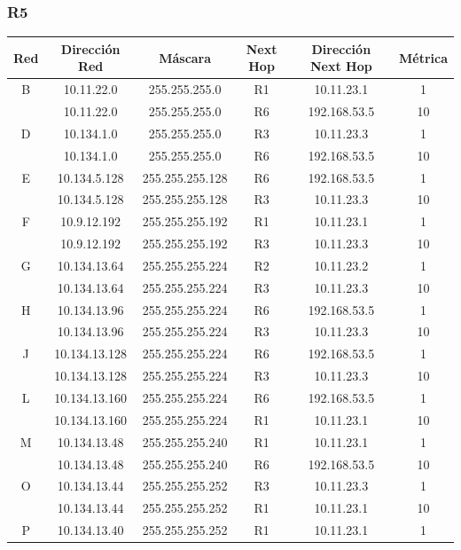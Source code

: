 \documentclass[12pt, a4paper, spanish]{article}
\begin{document}
\subsubsection{R5}
\begin{center}
\begin{tabular}{|c|c|c|c|c|c|}
	\hline
	Red & Dirección Red & Máscara & Next Hop & Dirección Next Hop & Métrica \\
	\hline
	\hline
	B & 10.11.22.0 & 255.255.255.0 & R1 & 10.11.23.1 & 1\\
	 & 10.11.22.0 & 255.255.255.0 & R6 & 192.168.53.5 & 10\\
	\hline
	D & 10.134.1.0 & 255.255.255.0 & R3 & 10.11.23.3 & 1\\
	 & 10.134.1.0 & 255.255.255.0 & R6 & 192.168.53.5 & 10\\
	\hline
	E & 10.134.5.128 & 255.255.255.128 & R6 & 192.168.53.5 & 1\\
	 & 10.134.5.128 & 255.255.255.128 & R3 & 10.11.23.3 & 10\\
	\hline
	F & 10.9.12.192 & 255.255.255.192 & R1 & 10.11.23.1 & 1\\
	 & 10.9.12.192 & 255.255.255.192 & R3 & 10.11.23.3 & 10\\
	\hline
	G & 10.134.13.64 & 255.255.255.224 & R2 & 10.11.23.2 & 1\\
	 & 10.134.13.64 & 255.255.255.224 & R3 & 10.11.23.3 & 10\\
	\hline
	H & 10.134.13.96 & 255.255.255.224 & R6 & 192.168.53.5 & 1\\
	 & 10.134.13.96 & 255.255.255.224 & R3 & 10.11.23.3 & 10\\
	\hline
	J & 10.134.13.128 & 255.255.255.224 & R6 & 192.168.53.5 & 1\\
	 & 10.134.13.128 & 255.255.255.224 & R3 & 10.11.23.3 & 10\\
	\hline
	L & 10.134.13.160 & 255.255.255.224 & R6 & 192.168.53.5 & 1\\
	 & 10.134.13.160 & 255.255.255.224 & R1 & 10.11.23.1 & 10\\
	\hline
	M & 10.134.13.48 & 255.255.255.240 & R1 & 10.11.23.1 & 1\\
	 & 10.134.13.48 & 255.255.255.240 & R6 & 192.168.53.5 & 10\\
	\hline
	O & 10.134.13.44 & 255.255.255.252 & R3 & 10.11.23.3 & 1\\
	 & 10.134.13.44 & 255.255.255.252 & R1 & 10.11.23.1 & 10\\
	\hline
	P & 10.134.13.40 & 255.255.255.252 & R1 & 10.11.23.1 & 1\\

\end{tabular}
\end{center}
\end{document}
